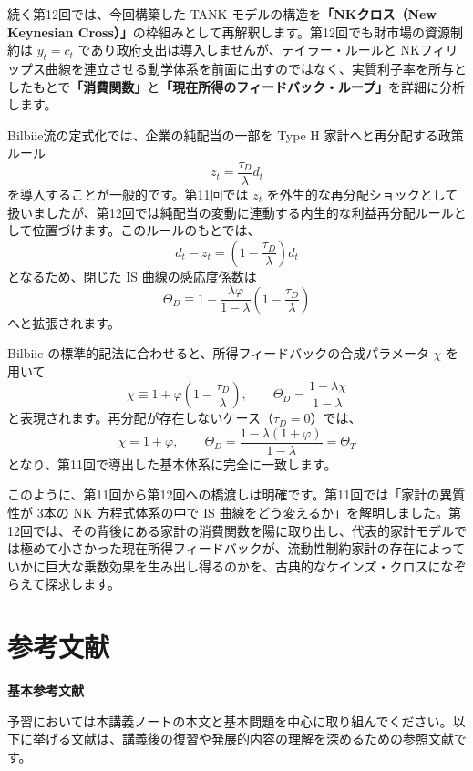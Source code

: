 \documentclass[
  japanese,
  lualatex,
  ja=standard,
  12pt,
  a4paper]{ltjsarticle}
\begin{document}
続く第12回では、今回構築した TANK モデルの構造を\textbf{「NKクロス（New
Keynesian
Cross）」}の枠組みとして再解釈します。第12回でも財市場の資源制約は
\(y_t = c_t\) であり政府支出は導入しませんが、テイラー・ルールと
NKフィリップス曲線を連立させる動学体系を前面に出すのではなく、実質利子率を所与としたもとで\textbf{「消費関数」}と\textbf{「現在所得のフィードバック・ループ」}を詳細に分析します。

Bilbiie流の定式化では、企業の純配当の一部を Type H
家計へと再分配する政策ルール \[
z_t = \frac{\tau_D}{\lambda} d_t
\] を導入することが一般的です。第11回では \(z_t\)
を外生的な再分配ショックとして扱いましたが、第12回では純配当の変動に連動する内生的な利益再分配ルールとして位置づけます。このルールのもとでは、
\[
d_t - z_t = \left( 1 - \frac{\tau_D}{\lambda} \right) d_t
\] となるため、閉じた IS 曲線の感応度係数は \[
\Theta_D \equiv 1 - \frac{\lambda \varphi}{1-\lambda}\left( 1 - \frac{\tau_D}{\lambda} \right)
\] へと拡張されます。


Bilbiie の標準的記法に合わせると、所得フィードバックの合成パラメータ
\(\chi\) を用いて \[
\chi \equiv 1 + \varphi\left( 1 - \frac{\tau_D}{\lambda} \right),
\qquad
\Theta_D = \frac{1 - \lambda \chi}{1-\lambda}
\] と表現されます。再分配が存在しないケース（\(\tau_D = 0\)）では、 \[
\chi = 1 + \varphi,
\qquad
\Theta_D = \frac{1 - \lambda(1+\varphi)}{1-\lambda} = \Theta_T
\] となり、第11回で導出した基本体系に完全に一致します。

このように、第11回から第12回への橋渡しは明確です。第11回では「家計の異質性が
3本の NK 方程式体系の中で IS
曲線をどう変えるか」を解明しました。第12回では、その背後にある家計の消費関数を陽に取り出し、代表的家計モデルでは極めて小さかった現在所得フィードバックが、流動性制約家計の存在によっていかに巨大な乗数効果を生み出し得るのかを、古典的なケインズ・クロスになぞらえて探求します。


\section{参考文献}\label{ux53c2ux8003ux6587ux732e}

\textbf{基本参考文献}

予習においては本講義ノートの本文と基本問題を中心に取り組んでください。以下に挙げる文献は、講義後の復習や発展的内容の理解を深めるための参照文献です。
\end{document}

